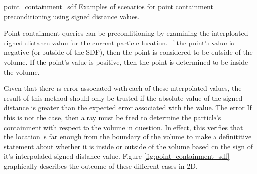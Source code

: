               {point_containment_sdf}
              {Examples of scenarios for point containment preconditioning using signed distance values.}
              {
                Point containment queries can be preconditioning by examining
                the interploated signed distance value for the current particle
                location. If the point's value is negative (or outside of the
                SDF), then the point is considered to be outside of the
                volume. If the point's value is positive, then the point is
                determined to be inside the volume.

                Given that there is error associated with each of these
                interpolated values, the result of this method should only be
                trusted if the absolute value of the signed distance is greater
                than the expected error associated with the value. The error If
                this is not the case, then a ray must be fired to determine the
                particle's containment with respect to the volume in
                question. In effect, this verifies that the location is far
                enough from the boundary of the volume to make a definititive
                statement about whether it is inside or outside of the volume
                based on the sign of it's interpolated signed distance value.
                Figure \ref{fig:point_containment_sdf} graphically describes the
                outcome of these different cases in 2D.
              }

